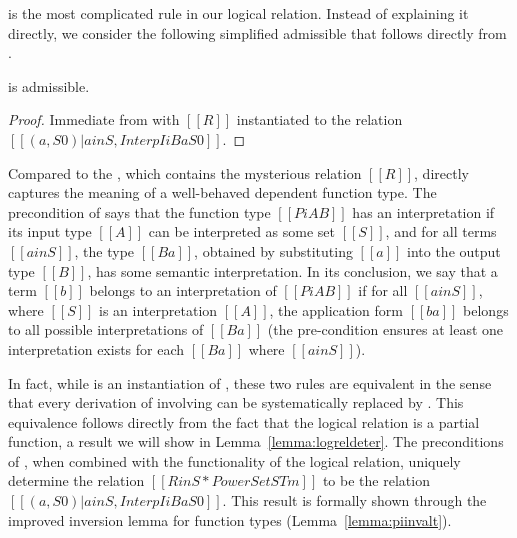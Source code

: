 \documentclass[acmsmall,screen=true,
\ifpublic review=false\else,review=true\fi
  ,anonymous=\ifanonymous true\else false\fi]{acmart}
\begin{document}
 is the most complicated rule in our logical
relation. Instead of explaining it directly, we consider the following
simplified admissible  that follows directly from .
\begin{center}
\end{center}
\begin{lemma}
  \label{lemma:piintroalt}
   is admissible.
\end{lemma}
\begin{proof}
Immediate from  with $[[R]]$ instantiated to the relation $[[{ (a
, S0 ) | a in S , Interp I i B { a } S0 }]]$.
\end{proof}
Compared to the , which contains the mysterious relation
$[[R]]$,  directly captures the meaning of
a well-behaved dependent function type. The precondition of
 says that
the function type $[[Pi A B]]$ has an interpretation if its input
type $[[A]]$ can be
interpreted as some set $[[S]]$, and for all terms $[[a in S]]$, the
type $[[B {a}]]$, obtained by substituting $[[a]]$ into the output type
$[[B]]$, has some semantic interpretation. In its conclusion, we say
that a term $[[b]]$ belongs to an interpretation of $[[Pi A B]]$ if
for all $[[a in S]]$, where $[[S]]$ is an interpretation $[[A]]$, the
application form $[[b a]]$ belongs to all possible interpretations of
$[[B {a}]]$ (the pre-condition ensures at least one interpretation
exists for each $[[B {a}]]$ where $[[a in S]]$).

In fact, while  is an instantiation of ,
these two rules are equivalent in the sense that every derivation of
involving  can be systematically replaced by
. This equivalence follows directly from the fact
that the logical relation is a partial function, a result we will show
in Lemma~\ref{lemma:logreldeter}. The preconditions of ,
when combined with the functionality of the logical relation, uniquely
determine the relation $[[R in S * PowerSet STm]]$ to be the relation
$[[{ (a , S0 ) | a in S , Interp I  i B { a } S0 }]]$. This result is
formally shown through the improved inversion lemma for function types
(Lemma~\ref{lemma:piinvalt}).
\end{document}
